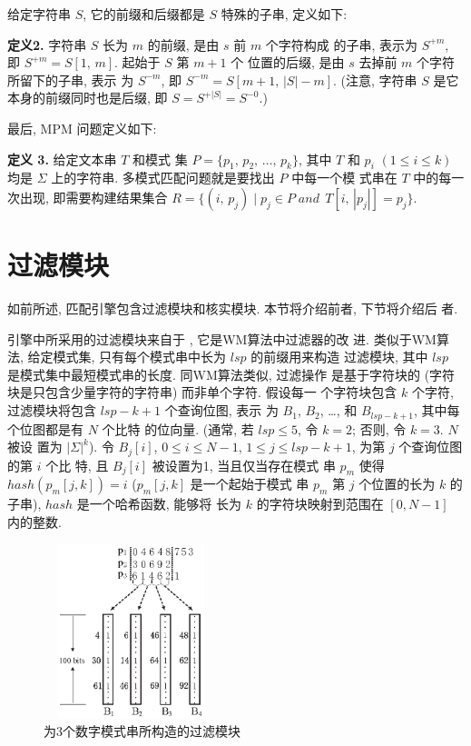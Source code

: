 给定字符串 $S$, 它的前缀和后缀都是 $S$ 特殊的子串, 定义如下:

\textbf{定义2.} 字符串 $S$ 长为 $m$ 的前缀, 是由 $s$ 前 $m$ 个字符构成
的子串, 表示为 $S^{+m}$, 即 $S^{+m}=S[1,\,m]$.  起始于 $S$ 第 $m+1$ 个
位置的后缀, 是由 $s$ 去掉前 $m$ 个字符所留下的子串, 表示
为 $S^{-m}$, 即 $S^{-m} = S[m+1,\,|S|-m]$. (注意, 字符串 $S$
是它本身的前缀同时也是后缀, 即 $S=S^{+|S|}=S^{-0}$.)

最后, MPM 问题定义如下: 

\textbf{定义 3.} 给定文本串 $T$ 和模式
集 $P=\{p_1,\,p_2,\,\dots,\,p_k\}$, 其中 $T$ 和 $p_i$ $(1 \leq i \leq
k)$ 均是 $\Sigma$ 上的字符串. 多模式匹配问题就是要找出 $P$ 中每一个模
式串在 $T$ 中的每一次出现, 即需要构建结果集合
$R = \{(i,\, p_j)\;|\; p_j \in P\; and\,\; T[i,\,|p_j|]=p_j\}$.


\section{过滤模块}
\label{sec:filter}

如前所述, 匹配引擎包含过滤模块和核实模块. 本节将介绍前者, 下节将介绍后
者.

引擎中所采用的过滤模块来自于 \cite{Lee2013}, 它是WM算法中过滤器的改
进. 类似于WM算法, 给定模式集, 只有每个模式串中长为 $lsp$ 的前缀用来构造
过滤模块, 其中 $lsp$ 是模式集中最短模式串的长度. 同WM算法类似, 过滤操作
是基于字符块的 (字符块是只包含少量字符的字符串) 而非单个字符. 假设每一
个字符块包含 $k$ 个字符, 过滤模块将包含 $lsp-k+1$ 个查询位图, 表示
为 $B_1$, $B_2$, \dots, 和 $B_{lsp-k+1}$, 其中每个位图都是有 $N$ 个比特
的位向量.  (通常, 若 $lsp \leq 5$, 令 $k = 2$; 否则, 令 $k=3$. $N$ 被设
置为 $|\Sigma|^k$). 令 $B_j[i]$, $0 \leq i \leq N - 1$,
$1 \leq j \leq lsp-k+1$, 为第 $j$ 个查询位图的第 $i$ 个比
特, 且 $B_j[i]$ 被设置为1, 当且仅当存在模式
串 $p_m$ 使得 $hash(p_m[j,k]) = i$ ($p_m[j,k]$ 是一个起始于模式
串 $p_m$ 第 $j$ 个位置的长为 $k$ 的子串), $hash$ 是一个哈希函数, 能够将
长为 $k$ 的字符块映射到范围在 $[0, N-1]$ 内的整数.

\begin{figure}[!h]
  \centering
  \includegraphics[height=2in, width=2in]{figures/2_MPM/filter.eps}
  \caption{为3个数字模式串所构造的过滤模块}
  \label{fig:filter}
\end{figure}

